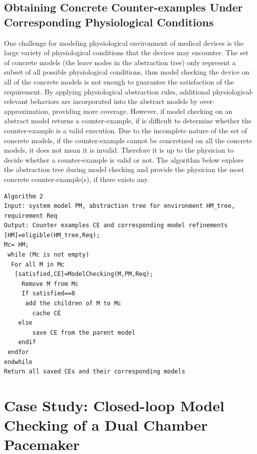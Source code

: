 \subsection{Obtaining Concrete Counter-examples Under Corresponding Physiological Conditions}
One challenge for modeling physiological environment of medical devices is the large variety of physiological conditions that the devices may encounter. %
The set of concrete models (the leave nodes in the abstraction tree) only represent a subset of all possible physiological conditions, thus model checking the device on all of the concrete models is not enough to guarantee the satisfaction of the requirement. By applying physiological abstraction rules, additional physiological-relevant behaviors are incorporated into the abstract models by over-approximation, providing more coverage. 
However, if model checking on an abstract model returns a counter-example, if is difficult to determine whether the counter-example is a valid execution. Due to the incomplete nature of the set of concrete models, if the counter-example cannot be concretized on all the concrete models, it does not mean it is invalid. Therefore it is up to the physician to decide whether a counter-example is valid or not. The algorithm below explore the abstraction tree during model checking and provide the physician the most concrete counter-example(s), if there exists any. 
\begin{Verbatim}
Algorithm 2
Input: system model PM, abstraction tree for environment HM_tree, requirement Req
Output: Counter examples CE and corresponding model refinements
[HM]=eligible(HM_tree,Req);
Mc= HM;
 while (Mc is not empty)
  For all M in Mc
   [satisfied,CE]=ModelChecking(M,PM,Req);
	 Remove M from Mc
	 If satisfied==0
	  add the children of M to Mc
		cache CE
	else
		save CE from the parent model
	endif
 endfor
endwhile
Return all saved CEs and their corresponding models
\end{Verbatim}

\section{Case Study: Closed-loop Model Checking of a Dual Chamber Pacemaker}
